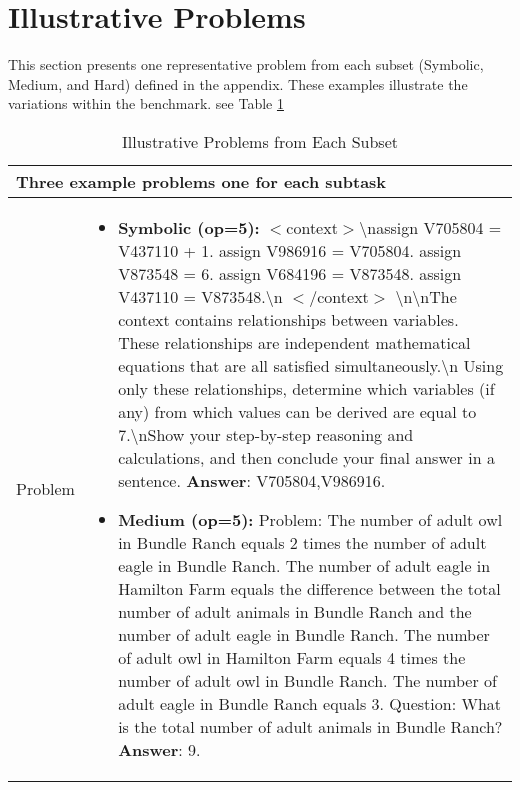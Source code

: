 \section{Illustrative Problems} 
\label{illustrative_problems} 
This section presents one representative problem from each subset (Symbolic, Medium, and Hard) defined in the appendix. These examples illustrate the variations within the benchmark. see Table \ref{tab:illustrative_problems}

\begin{table}[h]
\caption{Illustrative Problems from Each Subset}
\label{tab:illustrative_problems} 
\begin{tabular}{llll}
\toprule
\multicolumn{4}{l}{Three example problems one for each subtask} \\ 
\midrule
Problem & \multicolumn{3}{p{0.8\textwidth}}{\vspace{-0.5\baselineskip} %
\begin{itemize}
\item \textbf{Symbolic (op=5):} $<$context$>$\textbackslash nassign V705804 = V437110 + 1. assign V986916 = V705804. assign V873548 = 6. assign V684196 = V873548. assign V437110 = V873548.\textbackslash n $<$/context$>$ \textbackslash n\textbackslash nThe context contains relationships between variables. These relationships are independent mathematical equations that are all satisfied simultaneously.\textbackslash n Using only these relationships, determine which variables (if any) from which values can be derived are equal to 7.\textbackslash nShow your step-by-step reasoning and calculations, and then conclude your final answer in a sentence. \textbf{Answer}: V705804,V986916.
\item \textbf{Medium (op=5):} Problem: The number of adult owl in Bundle Ranch equals 2 times the number of adult eagle in Bundle Ranch. The number of adult eagle in Hamilton Farm equals the difference between the total number of adult animals in Bundle Ranch and the number of adult eagle in Bundle Ranch. The number of adult owl in Hamilton Farm equals 4 times the number of adult owl in Bundle Ranch. The number of adult eagle in Bundle Ranch equals 3.  Question: What is the total number of adult animals in Bundle Ranch?
\textbf{Answer}: 9.

\end{itemize}}
\end{tabular}
\end{table}
